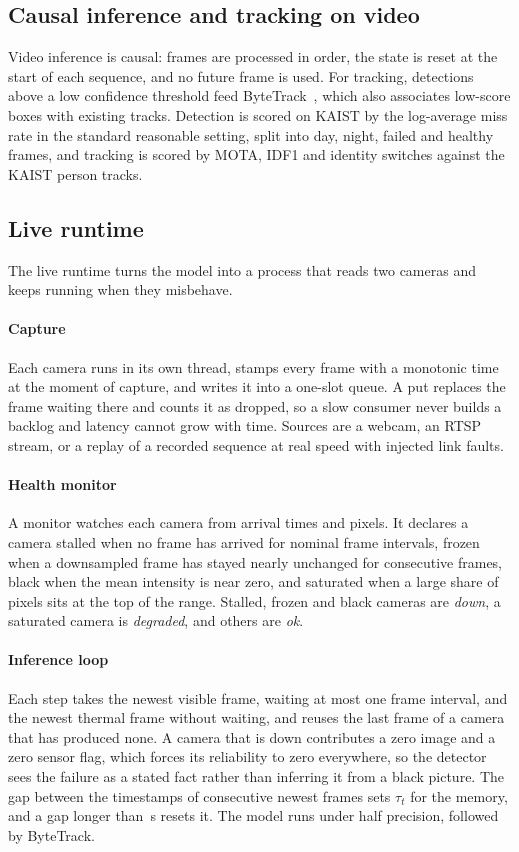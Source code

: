 \subsection{Causal inference and tracking on video}
\label{sec:causal}
Video inference is causal: frames are processed in order, the state is reset at the start of each sequence, and no future frame is used. For tracking, detections above a low confidence threshold feed ByteTrack~\cite{zhang2022bytetrack}, which also associates low-score boxes with existing tracks.  Detection is scored on KAIST by the log-average miss rate in the standard reasonable setting, split into day, night, failed and healthy frames, and tracking is scored by MOTA, IDF1 and identity switches against the KAIST person tracks.

\subsection{Live runtime}
\label{sec:live}
The live runtime turns the model into a process that reads two cameras and keeps running when they misbehave.

\paragraph{Capture}
Each camera runs in its own thread, stamps every frame with a monotonic time at the moment of capture, and writes it into a one-slot queue. A put replaces the frame waiting there and counts it as dropped, so a slow consumer never builds a backlog and latency cannot grow with time. Sources are a webcam, an RTSP stream, or a replay of a recorded sequence at real speed with injected link faults.

\paragraph{Health monitor}
A monitor watches each camera from arrival times and pixels. It declares a camera stalled when no frame has arrived for \cfgStallIntervals{} nominal frame intervals, frozen when a downsampled frame has stayed nearly unchanged for \cfgFreezeFrames{} consecutive frames, black when the mean intensity is near zero, and saturated when a large share of pixels sits at the top of the range. Stalled, frozen and black cameras are \emph{down}, a saturated camera is \emph{degraded}, and others are \emph{ok}.

\paragraph{Inference loop}
Each step takes the newest visible frame, waiting at most one frame interval, and the newest thermal frame without waiting, and reuses the last frame of a camera that has produced none. A camera that is down contributes a zero image and a zero sensor flag, which forces its reliability to zero everywhere, so the detector sees the failure as a stated fact rather than inferring it from a black picture. The gap between the timestamps of consecutive newest frames sets $\tau_t$ for the memory, and a gap longer than \cfgResetS{}\,s resets it. The model runs under half precision, followed by ByteTrack.


